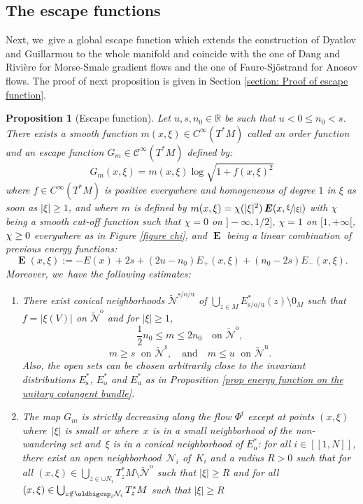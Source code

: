 \documentclass[JEP,XML,SOM,Unicode,NoEqCountersInSection,NoFloatCountersInSection,published]{cedram}
\newcommand{\lcr}{[\![}
\newcommand{\rcr}{]\!]}
\newcommand{\ro}{\mathrm{o}}
\newcommand{\rs}{\mathrm{s}}
\newcommand{\ru}{\mathrm{u}}
\theoremstyle{definition}
\theoremstyle{plain}
\newtheorem{prop}[definition]{Proposition}
\newcommand{\Ccal}{\mathcal{C}}
\newcommand{\Ncal}{\mathcal{N}}
\newcommand{\R}{\mathbb{R}}
\DeclareMathOperator{\E}{\boldsymbol{E}}
\begin{document}
\subsection{The escape functions}

Next, we~give a global escape function which extends the construction of Dyatlov and Guillarmou \cite{dyatlov-guillarmou_2016} to the whole manifold and coincide with the one of Dang and Rivière \cite{DR0} for Morse-Smale gradient flows and the one of Faure-Sjöstrand \cite{FS} for Anosov flows. The proof of next proposition is given in Section \ref{section: Proof of escape function}.

\begin{prop}[Escape function]\label{prop escape function}
Let $u,s,n_0 \in \R$ be such that $u < 0 \leq n_0 < s$. There exists a smooth function $m(x,\xi) \in C^{\infty} (T^* M)$ called an \emph{order function} and an \emph{escape function} $G_m \in \Ccal^{\infty} (T^*M)$ defined by:
\[
G_{m} (x, \xi) = m(x, \xi) \log \sqrt{1 + f(x,\xi)^2}
\]
where $f \in C^{\infty}(T^* M)$ is positive everywhere and homogeneous of degree $1$ in $\xi$ as soon as $|\xi| \geq 1$, and where $m$ is defined by $m(x,\xi) = \chi (|\xi|^2) \E(x,\sfrac{\xi}{|\xi|})$ with $\chi$ being a smooth cut-off function such that $\chi = 0$ on $]-\infty, 1/2]$, $\chi = 1$ on $[1,+\infty[$, $\chi \geq\nobreak 0$ everywhere as in Figure \ref{figure chi}, and $\E$ being a linear combination of previous energy functions:
\[
\E (x,\xi):= -E(x) + 2s + (2u - n_0) E_+ (x,\xi) + (n_0 - 2s) E_- (x,\xi).
\]
Moreover, we~have the following estimates:
\begin{enumerate}
\item\label{prop escape function1} There exist conical neighborhoods $\widetilde{\Ncal}^{\rs/\ro/\ru}$ of $\bigcup_{z \in M} E_{\rs/\ro/\ru}^* (z) \setminus 0_M$ such that $f = |\xi(V)|$ on $\widetilde{\Ncal}^\ro$ and for $|\xi| \geq 1$,
\[
\frac{1}{2} n_0 \leq m \leq 2n_0 \quad\text{on } \widetilde{\Ncal}^{\ro},
\]
\[
m \geq s \;\text{ on } \widetilde{\Ncal}^{\rs}, \quad \text{and} \quad m \leq u \;\text{ on } \widetilde{\Ncal}^{\ru}.
\]
Also, the open sets can be chosen arbitrarily close to the invariant distributions $E_\rs^*$, $E_\ro^*$ and $E_\ru^*$ as in Proposition \ref{prop energy function on the unitary cotangent bundle}.
\item\label{prop escape function2} The map $G_m$ is strictly decreasing along the flow $\Phi^t$ except at points $(x,\xi)$ where~$|\xi|$ is small or where~$x$ is in a small neighborhood of the non-wandering set and~$\xi$ is in a conical neighborhood of $E_\ro^*$: for all $i\in\lcr1,N\rcr$, there exist an open neighborhood~$\Ncal_i$ of~$K_i$ and a radius $R > 0$ such that for all $(x,\xi)\in \bigcup_{z\in \cup N_i} T_z^*M\setminus \widetilde{\Ncal}^\ro$ such that $ |\xi| \geq R$ \emph{and} for all $(x,\xi) \in \bigcup_{z\notin \oldbigcup_i \Ncal_i} T_z^*M$ such that $ |\xi| \geq R$

\end{enumerate}
\end{prop}
\end{document}
